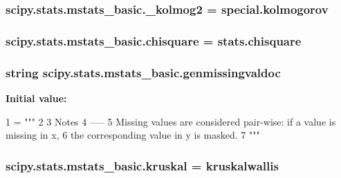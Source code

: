 \begin{DoxyVerb}
\begin{DoxyVerb}
\subsubsection[{\+\_\+kolmog2}]{\setlength{\rightskip}{0pt plus 5cm}scipy.\+stats.\+mstats\+\_\+basic.\+\_\+kolmog2 = {\bf special.\+kolmogorov}}\label{namespacescipy_1_1stats_1_1mstats__basic_af22bcae794f65bb23ce9fc2819ce3647}
\hypertarget{namespacescipy_1_1stats_1_1mstats__basic_a3592d3c150c776d432ac152bd106a179}{}
\subsubsection[{chisquare}]{\setlength{\rightskip}{0pt plus 5cm}scipy.\+stats.\+mstats\+\_\+basic.\+chisquare = stats.\+chisquare}\label{namespacescipy_1_1stats_1_1mstats__basic_a3592d3c150c776d432ac152bd106a179}
\hypertarget{namespacescipy_1_1stats_1_1mstats__basic_a6ec58bbd7fad669ea19fe669fa1b63c8}{}
\subsubsection[{genmissingvaldoc}]{\setlength{\rightskip}{0pt plus 5cm}string scipy.\+stats.\+mstats\+\_\+basic.\+genmissingvaldoc}\label{namespacescipy_1_1stats_1_1mstats__basic_a6ec58bbd7fad669ea19fe669fa1b63c8}
{\bfseries Initial value\+:}
\begin{DoxyCode}
1 = \textcolor{stringliteral}{"""}
2 \textcolor{stringliteral}{}
3 \textcolor{stringliteral}{    Notes}
4 \textcolor{stringliteral}{    -----}
5 \textcolor{stringliteral}{    Missing values are considered pair-wise: if a value is missing in x,}
6 \textcolor{stringliteral}{    the corresponding value in y is masked.}
7 \textcolor{stringliteral}{    """}
\end{DoxyCode}
\hypertarget{namespacescipy_1_1stats_1_1mstats__basic_a0328a0edece28c1872e7a78fdab7acdf}{}
\subsubsection[{kruskal}]{\setlength{\rightskip}{0pt plus 5cm}scipy.\+stats.\+mstats\+\_\+basic.\+kruskal = {\bf kruskalwallis}}\label{namespacescipy_1_1stats_1_1mstats__basic_a0328a0edece28c1872e7a78fdab7acdf}
\hypertarget{namespacescipy_1_1stats_1_1mstats__basic_aa7ceaef85d56c33ee9e2e9fc567d9264}{}

\end{DoxyVerb}
\end{DoxyVerb}
